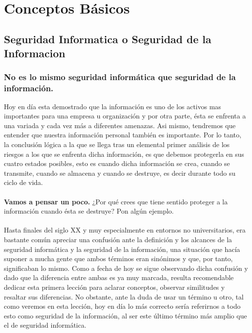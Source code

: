 \documentclass[10pt,a4paper]{book}
\begin{document}

\chapter{Conceptos Básicos}
\section{Seguridad Informatica o Seguridad de la Informacion}

\subsection*{No es lo mismo seguridad informática que seguridad de la información.}

Hoy en día  esta demostrado que la información es uno de los activos mas importantes para una empresa u organización y  por otra parte, ésta se enfrenta a una variada y cada vez más a diferentes amenazas. Asi mismo, tendremos que entender que nuestra información personal también es importante. Por lo tanto, la conclusión lógica a la que se llega tras un elemental primer análisis de los riesgos a los que se enfrenta dicha información, es que debemos protegerla en sus cuatro estados posibles, esto es cuando dicha información se crea, cuando se transmite, cuando se almacena y cuando se destruye, es decir durante todo su ciclo de vida.
\\{ }\\
\textbf{Vamos a pensar un poco.}
¿Por qué crees que tiene sentido proteger a la información cuando ésta se destruye? Pon algún ejemplo.
\\{ }\\
Hasta finales del siglo XX y muy especialmente en entornos no universitarios, era bastante común apreciar una confusión ante la definición y los alcances de la seguridad informática y la seguridad de la información, una situación que hacía suponer a mucha gente que ambos términos eran sinónimos y que, por tanto, significaban lo mismo. Como a fecha de hoy se sigue observando dicha confusión y dado que la diferencia entre ambas es ya muy marcada, resulta recomendable dedicar esta primera lección para aclarar conceptos, observar similitudes y resaltar sus diferencias. No obstante, ante la duda de usar un término u otro, tal como veremos en esta lección, hoy en día lo más correcto sería referirnos a todo esto como seguridad de la información, al ser este último término más amplio que el de seguridad informática.
\end{document}
